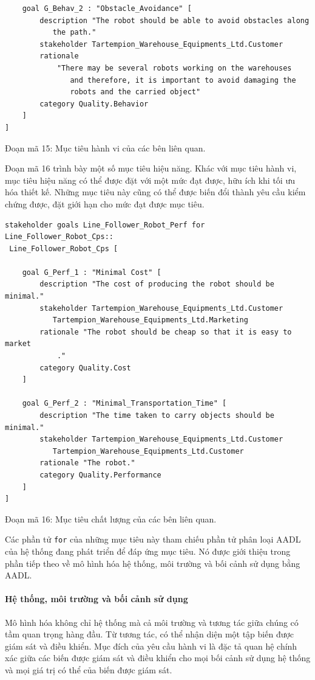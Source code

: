 \begin{verbatim}
    goal G_Behav_2 : "Obstacle_Avoidance" [
        description "The robot should be able to avoid obstacles along
           the path."
        stakeholder Tartempion_Warehouse_Equipments_Ltd.Customer
        rationale
            "There may be several robots working on the warehouses
               and therefore, it is important to avoid damaging the
               robots and the carried object"
        category Quality.Behavior
    ]
]
\end{verbatim}
\begin{center}\small Đoạn mã 15: Mục tiêu hành vi của các bên liên quan.\end{center}

Đoạn mã 16 trình bày một số mục tiêu hiệu năng. Khác với mục tiêu hành vi, mục tiêu hiệu năng có thể được đặt với một mức đạt được, hữu ích khi tối ưu hóa thiết kế. Những mục tiêu này cũng có thể được biến đổi thành yêu cầu kiểm chứng được, đặt giới hạn cho mức đạt được mục tiêu.
\begin{verbatim}
stakeholder goals Line_Follower_Robot_Perf for Line_Follower_Robot_Cps::
 Line_Follower_Robot_Cps [

    goal G_Perf_1 : "Minimal Cost" [
        description "The cost of producing the robot should be minimal."
        stakeholder Tartempion_Warehouse_Equipments_Ltd.Customer
           Tartempion_Warehouse_Equipments_Ltd.Marketing
        rationale "The robot should be cheap so that it is easy to market
            ."
        category Quality.Cost
    ]

    goal G_Perf_2 : "Minimal_Transportation_Time" [
        description "The time taken to carry objects should be minimal."
        stakeholder Tartempion_Warehouse_Equipments_Ltd.Customer
           Tartempion_Warehouse_Equipments_Ltd.Customer
        rationale "The robot."
        category Quality.Performance
    ]
]
\end{verbatim}
\begin{center}\small Đoạn mã 16: Mục tiêu chất lượng của các bên liên quan.\end{center}

Các phần tử \texttt{for} của những mục tiêu này tham chiếu phần tử phân loại AADL của hệ thống đang phát triển để đáp ứng mục tiêu. Nó được giới thiệu trong phần tiếp theo về mô hình hóa hệ thống, môi trường và bối cảnh sử dụng bằng AADL.

\paragraph*{Hệ thống, môi trường và bối cảnh sử dụng}
Mô hình hóa không chỉ hệ thống mà cả môi trường và tương tác giữa chúng có tầm quan trọng hàng đầu. Từ tương tác, có thể nhận diện một tập biến được giám sát và điều khiển. Mục đích của yêu cầu hành vi là đặc tả quan hệ chính xác giữa các biến được giám sát và điều khiển cho mọi bối cảnh sử dụng hệ thống và mọi giá trị có thể của biến được giám sát.

